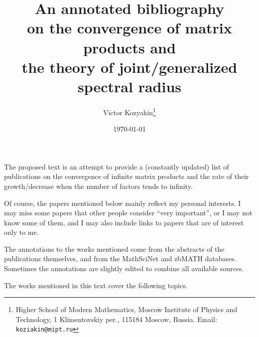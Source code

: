 \documentclass[a4paper,fleqn]{article}
\begin{document}
\title{\bf An annotated bibliography\\ on the convergence of matrix products and\\ the theory of joint/generalized spectral radius}

\author{Victor Kozyakin\thanks{Higher School of Modern Mathematics, Moscow Institute of Physics and Technology, 1 Klimentovskiy per., 115184 Moscow, Russia. Email: \texttt{koziakin@mipt.ru}}}

\date{\today}

\maketitle

%
The proposed text is an attempt to provide a (constantly updated) list of publications on the convergence of infinite matrix products and the rate of their growth/decrease when the number of factors tends to infinity.

Of course, the papers mentioned below mainly reflect my personal interests. I may miss some papers that other people consider ``very important'', or I may not know some of them, and I may also include links to papers that are of interest only to me.

The annotations to the works mentioned come from the abstracts of the publications themselves, and from the MathSciNet and zbMATH databases. Sometimes the annotations are slightly edited to combine all available sources.

The works mentioned in this text cover the following topics.
\end{document}
